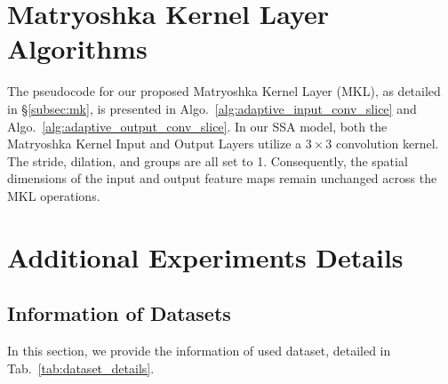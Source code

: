 \setcounter{page}{1}



\section{Matryoshka Kernel Layer Algorithms}
\label{mkl_algos}
The pseudocode for our proposed Matryoshka Kernel Layer (MKL), as detailed in \S\ref{subsec:mk}, is presented in Algo.~\ref{alg:adaptive_input_conv_slice} and Algo.~\ref{alg:adaptive_output_conv_slice}. 
In our SSA model, both the Matryoshka Kernel Input and Output Layers utilize a $3 \times 3$ convolution kernel. 
The stride, dilation, and groups are all set to 1. 
Consequently, the spatial dimensions of the input and output feature maps remain unchanged across the MKL operations.




\section{Additional Experiments Details}

\subsection{Information of Datasets}
In this section, we provide the information of used dataset, detailed in Tab.~\ref{tab:dataset_details}.

